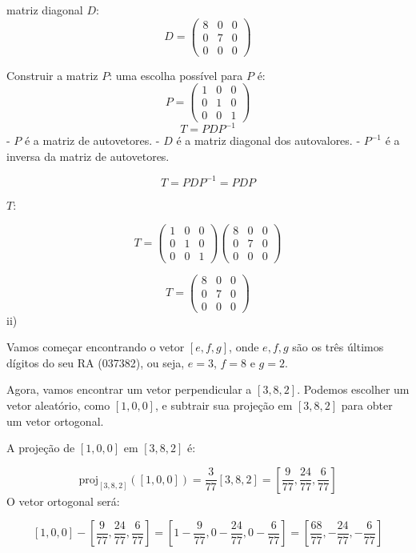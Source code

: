 matriz diagonal \( D \):
   \[ D = \begin{pmatrix} 8 & 0 & 0 \\ 0 & 7 & 0 \\ 0 & 0 & 0 \end{pmatrix} \]

Construir a matriz \( P \):
 uma escolha possível para \( P \) é:
   \[ P = \begin{pmatrix} 1 & 0 & 0 \\ 0 & 1 & 0 \\ 0 & 0 & 1 \end{pmatrix} \]
   \[ T = PDP^{-1} \]
- \( P \) é a matriz de autovetores.
- \( D \) é a matriz diagonal dos autovalores.
- \( P^{-1} \) é a inversa da matriz de autovetores.


\[ T = PDP^{-1} = PDP \]

 \( T \):

\[ T = \begin{pmatrix} 1 & 0 & 0 \\ 0 & 1 & 0 \\ 0 & 0 & 1 \end{pmatrix} \begin{pmatrix} 8 & 0 & 0 \\ 0 & 7 & 0 \\ 0 & 0 & 0 \end{pmatrix} \]

\[ T = \begin{pmatrix} 8 & 0 & 0 \\ 0 & 7 & 0 \\ 0 & 0 & 0 \end{pmatrix} \] ii)


Vamos começar encontrando o vetor \( [e, f, g] \), onde \( e, f, g \) são os três últimos dígitos do seu RA (037382), ou seja, \( e = 3 \), \( f = 8 \) e \( g = 2 \).

Agora, vamos encontrar um vetor perpendicular a \( [3, 8, 2] \). Podemos escolher um vetor aleatório, como \( [1, 0, 0] \), e subtrair sua projeção em \( [3, 8, 2] \) para obter um vetor ortogonal.

A projeção de \( [1, 0, 0] \) em \( [3, 8, 2] \) é:

\[ \text{proj}_{[3, 8, 2]}([1, 0, 0]) = \frac{3}{77} [3, 8, 2] = \left[ \frac{9}{77}, \frac{24}{77}, \frac{6}{77} \right] \]
O vetor ortogonal será:

\[ \left[ 1, 0, 0 \right] - \left[ \frac{9}{77}, \frac{24}{77}, \frac{6}{77} \right] = \left[ 1 - \frac{9}{77}, 0 - \frac{24}{77}, 0 - \frac{6}{77} \right] = \left[ \frac{68}{77}, -\frac{24}{77}, -\frac{6}{77} \right] \]


